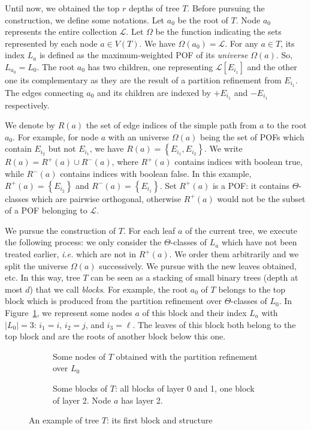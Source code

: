 \documentclass[a4paper,UKenglish,numberwithinsect,cleveref, autoref]{lipics-v2021}
\newcommand{\set}[1]{\left\{ #1 \right\}}
\newcommand{\card}[1]{\left| #1 \right|}
\begin{document}
Until now, we obtained the top $r$ depths of tree $T$. Before pursuing the construction, we define some notations. Let $a_0$ be the root of $T$. Node $a_0$ represents the entire collection $\mathcal{L}$. Let $\Omega$ be the function indicating the sets represented by each node $a \in V(T)$. We have $\Omega(a_0) = \mathcal{L}$. For any $a \in T$, its index $L_a$ is defined as the maximum-weighted POF of its \textit{universe} $\Omega(a)$. So, $L_{a_0} = L_0$. The root $a_0$ has two children, one representing $\mathcal{L}\left[E_{i_1}\right]$ and the other one its complementary as they are the result of a partition refinement from $E_{i_1}$. The edges connecting $a_0$ and its children are indexed by $+E_{i_1}$ and $-E_{i_1}$ respectively. 

We denote by $R(a)$ the set of edge indices of the simple path from $a$ to the root $a_0$. For example, for node $a$ with an universe $\Omega(a)$ being the set of POFs which contain  $E_{i_2}$ but not $E_{i_1}$, we have $R(a)=\set{E_{i_1},E_{i_2}}$. We write $R(a) = R^+(a) \cup R^-(a)$, where $R^+(a)$ contains indices with boolean true, while $R^-(a)$ contains indices with boolean false. In this example, $R^+(a) = \set{E_{i_2}}$ and $R^-(a) = \set{E_{i_1}}$. Set $R^+(a)$ is a POF: it contains $\Theta$-classes which are pairwise orthogonal, otherwise $R^+(a)$ would not be the subset of a POF belonging to $\mathcal{L}$.

We pursue the construction of $T$. For each leaf $a$ of the current tree, we execute the following process: we only consider the $\Theta$-classes of $L_a$ which have not been treated earlier, {\em i.e.} which are not in $R^+(a)$. We order them arbitrarily and we split the universe $\Omega(a)$ successively. We pursue with the new leaves obtained, etc. In this way, tree $T$ can be seen as a stacking of small binary trees (depth at most $d$) that we call \textit{blocks}. For example, the root $a_0$ of $T$ belongs to the top block which is produced from the partition refinement over $\Theta$-classes of $L_0$. In Figure~\ref{subfig:first_layer}, we represent some nodes $a$ of this block and their index $L_a$ with $\card{L_0} = 3$: $i_1 = i$, $i_2 = j$, and $i_3 = \ell$. The leaves of this block both belong to the top block and are the roots of another block below this one.

\begin{figure}[h]
\centering
\begin{subfigure}[b]{0.40\columnwidth}
\centering
\scalebox{0.7}{}
\caption{Some nodes of $T$ obtained with the partition refinement over $L_0$}
\label{subfig:first_layer}
\end{subfigure}
\begin{subfigure}[b]{0.59\columnwidth}
\centering
\scalebox{0.7}{}
\caption{Some blocks of $T$: all blocks of layer 0 and 1, one block of layer 2. Node $a$ has layer 2.}
\label{subfig:layers}
\end{subfigure}

\caption{An example of tree $T$: its first block and structure}
\label{fig:tree_2}
\end{figure}
\end{document}

